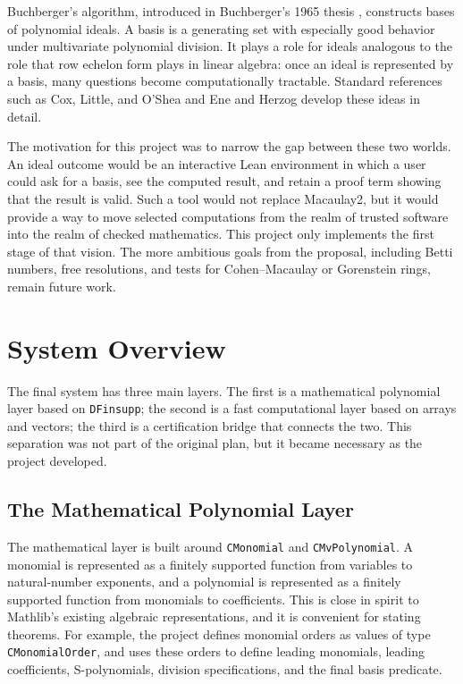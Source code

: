 \documentclass[acmsmall,nonacm,screen]{acmart}
\begin{document}
Buchberger's algorithm, introduced in Buchberger's 1965 thesis \cite{Buchberger1965}, constructs
\Groebner{} bases of polynomial ideals.
A \Groebner{} basis is a generating set with especially good behavior under multivariate
polynomial division.
It plays a role for ideals analogous to the role that row echelon form plays in linear algebra:
once an ideal is represented by a \Groebner{} basis, many questions become computationally
tractable.
Standard references such as Cox, Little, and O'Shea \cite{CoxLittleOShea} and Ene and Herzog
\cite{EneHerzog} develop these ideas in detail.

The motivation for this project was to narrow the gap between these two worlds.
An ideal outcome would be an interactive Lean environment in which a user could ask for a
\Groebner{} basis, see the computed result, and retain a proof term showing that the result is
valid.
Such a tool would not replace Macaulay2, but it would provide a way to move selected computations
from the realm of trusted software into the realm of checked mathematics.
This project only implements the first stage of that vision.
The more ambitious goals from the proposal, including Betti numbers, free resolutions, and tests
for Cohen--Macaulay or Gorenstein rings, remain future work.

\section{System Overview}

The final system has three main layers.
The first is a mathematical polynomial layer based on \texttt{DFinsupp}; the second is a fast
computational layer based on arrays and vectors; the third is a certification bridge that connects
the two.
This separation was not part of the original plan, but it became necessary as the project developed.

\subsection{The Mathematical Polynomial Layer}

The mathematical layer is built around \texttt{CMonomial} and \texttt{CMvPolynomial}.
A monomial is represented as a finitely supported function from variables to natural-number
exponents, and a polynomial is represented as a finitely supported function from monomials to
coefficients.
This is close in spirit to Mathlib's existing algebraic representations, and it is convenient for
stating theorems.
For example, the project defines monomial orders as values of type \texttt{CMonomialOrder}, and
uses these orders to define leading monomials, leading coefficients, S-polynomials, division
specifications, and the final \Groebner{} basis predicate.
\end{document}
